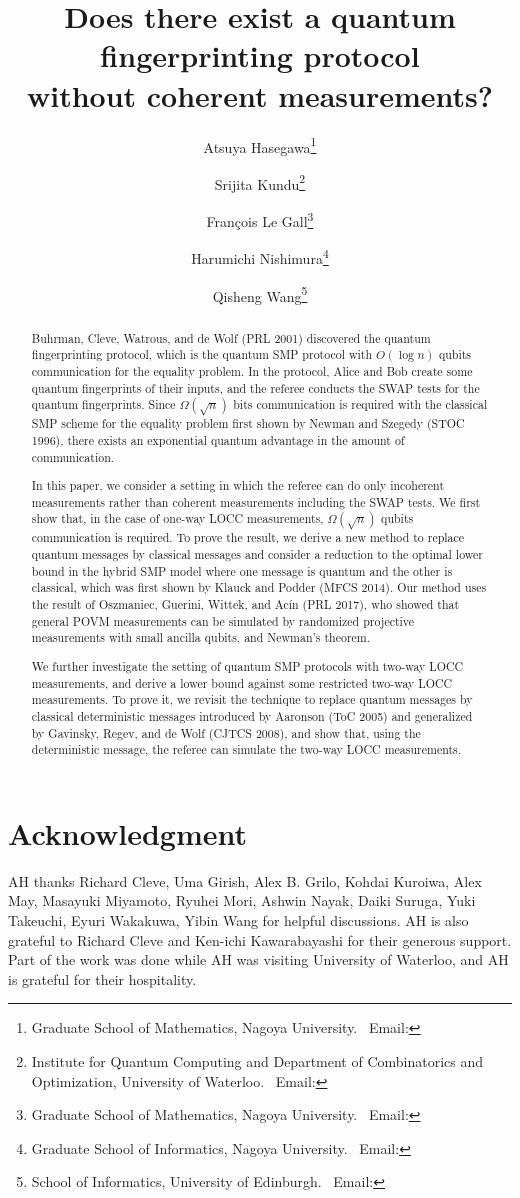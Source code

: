 \documentclass[11pt]{article}
\title{Does there exist a quantum fingerprinting protocol \\ without coherent measurements?}
\author{Atsuya Hasegawa\thanks{Graduate School of Mathematics, Nagoya University. \ Email: \email{atsuya.hasegawa@math.nagoya-u.ac.jp}} \and Srijita Kundu\thanks{Institute for Quantum Computing and Department of Combinatorics and Optimization, University of Waterloo. \ Email: \email{srijita.kundu@uwaterloo.ca}} \and Fran{\c{c}}ois Le Gall\thanks{Graduate School of Mathematics, Nagoya University. \ Email: \email{legall@math.nagoya-u.ac.jp}} \and Harumichi Nishimura\thanks{Graduate School of Informatics, Nagoya University. \ Email: \email{hnishimura@i.nagoya-u.ac.jp}} \and Qisheng Wang\thanks{School of Informatics, University of Edinburgh. \ Email: \email{QishengWang1994@gmail.com}}}
\date{}
\theoremstyle{remark}
\begin{document}
\maketitle

\begin{abstract}
Buhrman, Cleve, Watrous, and de Wolf (PRL 2001) discovered the quantum fingerprinting protocol, which is the quantum SMP protocol with $O(\log n)$ qubits communication for the equality problem. In the protocol, Alice and Bob create some quantum fingerprints of their inputs, and the referee conducts the SWAP tests for the quantum fingerprints. Since $\Omega(\sqrt{n})$ bits communication is required with the classical SMP scheme for the equality problem first shown by Newman and Szegedy (STOC 1996), there exists an exponential quantum advantage in the amount of communication.

In this paper, we consider a setting in which the referee can do only incoherent measurements rather than coherent measurements including the SWAP tests. We first show that, in the case of one-way LOCC measurements, $\Omega(\sqrt{n})$ qubits communication is required. To prove the result, we derive a new method to replace quantum messages by classical messages and consider a reduction to the optimal lower bound in the hybrid SMP model where one message is quantum and the other is classical, which was first shown by Klauck and Podder (MFCS 2014). Our method uses the result of Oszmaniec, Guerini, Wittek, and Ac{\'i}n (PRL 2017), who showed that general POVM measurements can be simulated by randomized projective measurements with small ancilla qubits, and Newman's theorem.

We further investigate the setting of quantum SMP protocols with two-way LOCC measurements, and derive a lower bound against some restricted two-way LOCC measurements. To prove it, we revisit the technique to replace quantum messages by classical deterministic messages introduced by Aaronson (ToC 2005) and generalized by Gavinsky, Regev, and de Wolf (CJTCS 2008), and show that, using the deterministic message, the referee can simulate the two-way LOCC measurements.
\end{abstract}

\clearpage

\tableofcontents







\section*{Acknowledgment}
AH thanks Richard Cleve, Uma Girish, Alex B. Grilo, Kohdai Kuroiwa, Alex May, Masayuki Miyamoto, Ryuhei Mori, Ashwin Nayak, Daiki Suruga, Yuki Takeuchi, Eyuri Wakakuwa, Yibin Wang for helpful discussions. AH is also grateful to Richard Cleve and Ken-ichi Kawarabayashi for their generous support. Part of the work was done while AH was visiting University of Waterloo, and AH is grateful for their hospitality.
\end{document}
